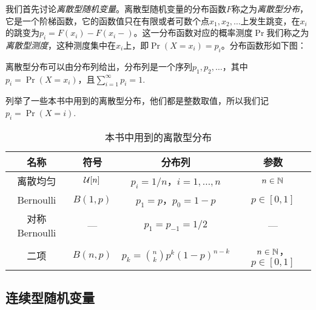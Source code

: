 我们首先讨论\emph{离散型随机变量}。离散型随机变量的分布函数$F$称之为\emph{离散型分布}，它是一个阶梯函数，它的函数值只在有限或者可数个点$x_1,x_2,\dots$上发生跳变，在$x_i$的跳变为$p_i=F(x_i)-F(x_i-)$。这一分布函数对应的概率测度$\Pr$我们称之为\emph{离散型测度}，这种测度集中在$x_i$上，即$\Pr(X=x_i)=p_i$。分布函数形如下图：

\begin{center}
\end{center}

离散型分布可以由分布列给出，分布列是一个序列$p_1,p_2,\dots$，其中$p_i=\Pr(X=x_i)$，且$\sum_{i=1}^\infty p_i=1$.

 列举了一些本书中用到的离散型分布，他们都是整数取值，所以我们记$p_i=\Pr(X=i)$.

\begin{table}[htbp]
\centering
\begin{tabular}{cccc}
\toprule
名称 & 符号 & 分布列 & 参数 \\
\midrule
离散均匀\index{分布!离散均匀～} & $\mathcal{U}[n]$ &$p_i=1/n$，$i=1,\dots,n$ & $n\in\mathbb{N}$ \\
Bernoulli\index{分布!Bernoulli～} & $B(1,p)$ & $p_1=p$，$p_0=1-p$ & $p\in[0,1]$ \\
对称Bernoulli\index{分布!对称Bernoulli～} & — &$p_1=p_{-1}=1/2$ & — \\
二项\index{分布!二项～} &$B(n,p)$ &$p_k=\binom{n}{k}p^k(1-p)^{n-k}$ & $n\in\mathbb{N}$，$p\in[0,1]$ \\
\bottomrule
\end{tabular}
\caption{本书中用到的离散型分布}
\label{tab:discrete-distribution}
\end{table}

\subsection{连续型随机变量}

